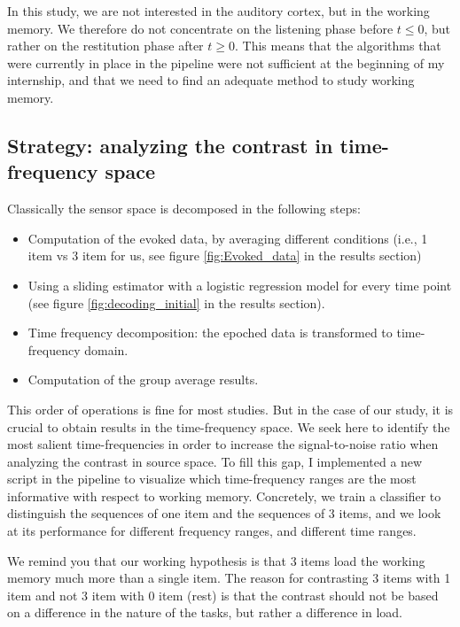 In this study, we are not interested in the auditory cortex, but in the working memory. We therefore do not concentrate on the listening phase before $t \leq 0$, but rather on the restitution phase after $t \geq 0$. This means that the algorithms that were currently in place in the pipeline were not sufficient at the beginning of my internship, and that we need to find an adequate method to study working memory.

\subsection{Strategy: analyzing the contrast in time-frequency space}

Classically the sensor space is decomposed in the following steps:
\begin{itemize}
    \item Computation of the evoked data, by averaging different conditions (i.e., 1 item vs 3 item for us, see figure \ref{fig:Evoked_data} in the results section)
    \item Using a sliding estimator with a logistic regression model for every time point (see figure \ref{fig:decoding_initial} in the results section).
    \item Time frequency decomposition: the epoched data is transformed to time-frequency domain.
    \item Computation of the group average results.
\end{itemize}

This order of operations is fine for most studies. But in the case of our study, it is crucial to obtain results in the time-frequency space. We seek here to identify the most salient time-frequencies in order to increase the signal-to-noise ratio when analyzing the contrast in source space. To fill this gap, I implemented a new script in the pipeline to visualize which time-frequency ranges are the most informative with respect to working memory. Concretely, we train a classifier to distinguish the sequences of one item and the sequences of 3 items, and we look at its performance for different frequency ranges, and different time ranges.

We remind you that our working hypothesis is that 3 items load the working memory much more than a single item. The reason for contrasting 3 items with 1 item and not 3 item with 0 item (rest) is that the contrast should not be based on a difference in the nature of the tasks, but rather a difference in load.

